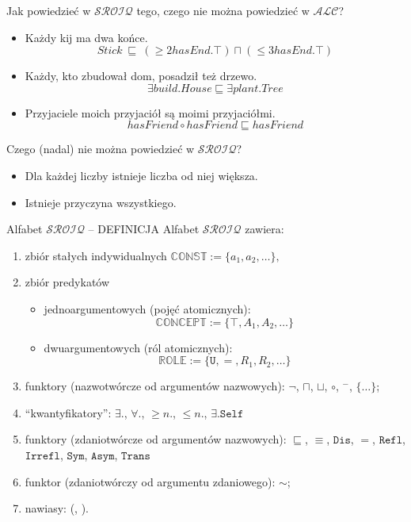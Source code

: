 \documentclass{beamer}
\begin{document}
\begin{frame}{Jak powiedzieć w $\mathcal{SROIQ}$ tego, czego nie można powiedzieć w $\mathcal{ALC}$?}
%
\begin{itemize}
\item Każdy kij ma dwa końce.
$$Stick ~\sqsubseteq~ (\geq 2 hasEnd . \top) \sqcap (\leq 3 hasEnd . \top)$$
%
\item Każdy, kto zbudował dom, posadził też drzewo.
$$\exists build . House \sqsubseteq \exists plant . Tree$$
%
\item Przyjaciele moich przyjaciół są moimi przyjaciółmi.
$$hasFriend \circ hasFriend \sqsubseteq hasFriend$$
\end{itemize}
\end{frame}

\begin{frame}{Czego (nadal) nie można powiedzieć w $\mathcal{SROIQ}$?}
%
\begin{itemize}
\item Dla każdej liczby istnieje liczba od niej większa.
\item Istnieje przyczyna wszystkiego.
\end{itemize}
\end{frame}

\begin{frame}{Alfabet $\mathcal{SROIQ}$ -- DEFINICJA}
Alfabet $\mathcal{SROIQ}$ zawiera:
\begin{enumerate}
\item zbiór stałych indywidualnych $\mathbb{CONST} := \{a_{1}, a_{2}, \dots\},$
\item zbiór predykatów 
\begin{itemize}
\item jednoargumentowych (pojęć atomicznych):
$$\mathbb{CONCEPT} := \{\top, A_{1}, A_{2}, \dots\}$$
\item dwuargumentowych (ról atomicznych):
$$\mathbb{ROLE} := \{\texttt{U}, =, R_{1}, R_{2}, \dots\}$$
\end{itemize}
\item funktory (nazwotwórcze od argumentów nazwowych): $\neg$, $\sqcap$, $\sqcup$, $\circ$, $^{-}$, $\{\dots\}$;
\item ``kwantyfikatory'': $\exists .$, $\forall .$, $\geq n . $, $\leq n . $, $\exists . \texttt{Self}$
\item funktory (zdaniotwórcze od argumentów nazwowych): $\sqsubseteq$, $\equiv$, $\texttt{Dis}$, $=$, $\texttt{Refl}$, $\texttt{Irrefl}$, $\texttt{Sym}$, $\texttt{Asym}$, $\texttt{Trans}$
\item funktor (zdaniotwórczy od argumentu zdaniowego): $\sim$;
\item nawiasy: (, ).
\end{enumerate}
\end{frame}
\end{document}
